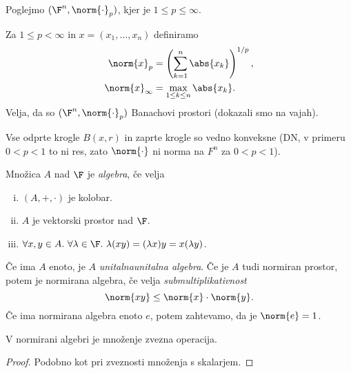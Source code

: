 
\begin{primer}
    Poglejmo $(\F^n, \norm{\cdot}_p)$, kjer je $1 \le p \le \infty$.

    Za $1 \le p < \infty$ in $x = (x_1, \dots, x_n)$ definiramo
    \begin{align*}
        \norm{x}_p &= \left(\sum_{k=1}^n \abs{x_k}\right)^{1/p}, \\
        \norm{x}_\infty &= \max_{1 \le k \le n} \abs{x_k}.
    \end{align*}
    Velja, da so $(\F^n, \norm{\cdot}_p)$ Banachovi prostori
    (dokazali smo na vajah).
    
    Vse odprte krogle $B(x, r)$ in zaprte krogle so vedno 
    konveksne (DN, v primeru $0 < p < 1$ to ni res,
    zato $\norm{\cdot}$ ni norma na $F^n$ za $0 < p < 1$).
\end{primer}

\begin{definicija}
    Množica $A$ nad $\F$ je \emph{algebra}, če velja
    \begin{enumerate}[(i)]
        \item $(A, +, \cdot)$ je kolobar.
        \item $A$ je vektorski prostor nad $\F$.
        \item $\forall x,y\in A.~\forall \lambda \in \F.~\lambda(xy) = (\lambda x)y = x(\lambda y)$.
    \end{enumerate}
    Če ima $A$ enoto, je $A$ \emph{unitalna}\emph{unitalna algebra}. Če je 
    $A$ tudi normiran prostor, potem je normirana algebra,
    če velja \emph{submultiplikativnost}
    \[
        \norm{x y} \le \norm{x} \cdot \norm{y}.
    \]
    Če ima normirana algebra enoto $e$, potem zahtevamo, da 
    je $\norm{e} = 1$.
\end{definicija}

\begin{trditev}
    V normirani algebri je množenje zvezna operacija.
\end{trditev}

\begin{proof}
    Podobno kot pri zveznosti množenja s skalarjem.
\end{proof}

